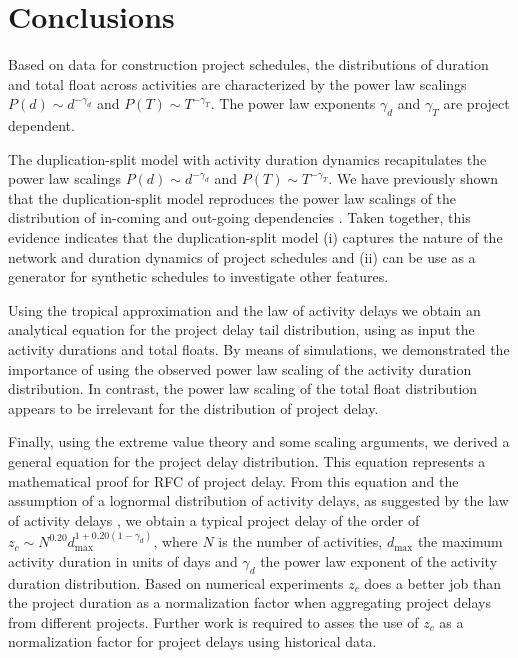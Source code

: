 \documentclass[11pt]{article}
\begin{document}
\section{Conclusions}

Based on data for construction project schedules, the distributions of duration and total float across activities are characterized by the power law scalings $P(d)\sim d^{-\gamma_d}$ and $P(T)\sim T^{-\gamma_T}$. The power law exponents $\gamma_d$ and $\gamma_T$ are project dependent.

The duplication-split model with activity duration dynamics recapitulates the power law scalings $P(d)\sim d^{-\gamma_d}$ and $P(T)\sim T^{-\gamma_T}$. We have previously shown that the duplication-split model reproduces the power law scalings of the distribution of in-coming and out-going dependencies \cite{vazquez23}. Taken together, this evidence indicates that the duplication-split model (i) captures the nature of the network and duration dynamics of project schedules and (ii) can be use as a generator for synthetic schedules to investigate other features.

Using the tropical approximation \cite{vazquez_tropical22} and the law of activity delays \cite{vazquez23law} we obtain an analytical equation for the project delay tail distribution, using as input the activity durations and total floats. By means of simulations, we demonstrated the importance of using the observed power law scaling of the activity duration distribution. In contrast, the power law scaling of the total float distribution appears to be irrelevant  for the distribution of project delay.

Finally, using the extreme value theory and some scaling arguments, we derived a general equation for the project delay distribution. This equation represents a mathematical proof for RFC of project delay.
From this equation and the assumption of a lognormal distribution of activity delays, as suggested by the law of activity delays \cite{vazquez23law}, we obtain a typical project delay of the order of $z_c \sim N^{0.20}d_{\max}^{1+0.20(1-\gamma_d)}$, where $N$ is the number of activities, $d_{\max}$ the maximum activity duration in units of days and $\gamma_d$ the power law exponent of the activity duration distribution. Based on numerical experiments $z_c$ does a better job than the project duration as a normalization factor when aggregating project delays from different projects. Further work is required to asses the use of $z_c$ as a normalization factor for project delays using historical data.
\end{document}
